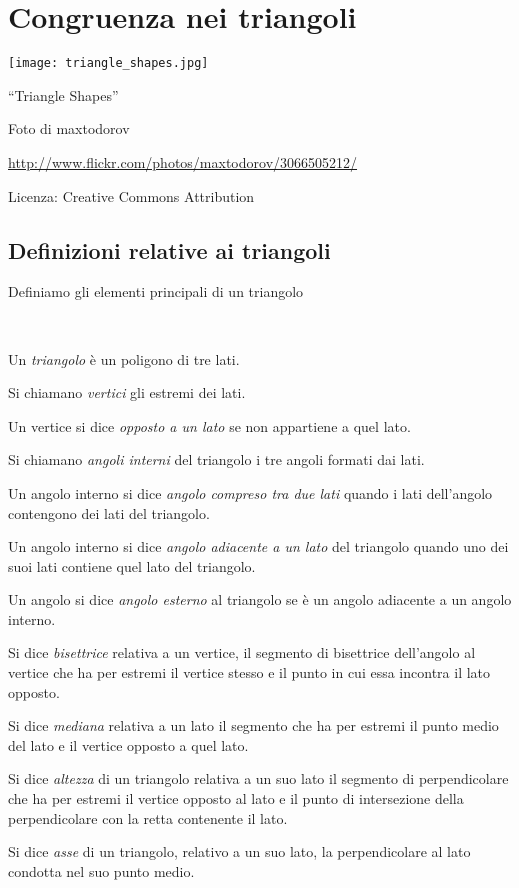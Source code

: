 
\chapter{Congruenza nei triangoli}\label{chap:congruenza_nei_triangoli}

\texttt{[image: triangle\_shapes.jpg]}
  \begin{center}
    {\large ``Triangle Shapes''}\par
    Foto di maxtodorov\par
    \url{http://www.flickr.com/photos/maxtodorov/3066505212/}\par
    Licenza: Creative Commons Attribution\par
  \end{center}
\newpage

\section{Definizioni relative ai triangoli}\label{sect:definizioni_triangoli}

Definiamo gli elementi principali di un triangolo
\begin{definizione}~
\begin{itemize*}
\item Un \emph{triangolo} è un poligono di tre lati.
\item Si chiamano \emph{vertici} gli estremi dei lati.
\item Un vertice si dice \emph{opposto a un lato} se non appartiene a quel lato.
\item Si chiamano \emph{angoli interni} del triangolo i tre angoli formati dai lati.
\item Un angolo interno si dice \emph{angolo compreso tra due lati} quando i lati dell'angolo contengono dei lati del triangolo.
\item Un angolo interno si dice \emph{angolo adiacente a un lato} del triangolo quando uno dei suoi lati contiene quel lato del triangolo.
\item Un angolo si dice \emph{angolo esterno} al triangolo se è un angolo adiacente a un angolo interno.
\item Si dice \emph{bisettrice} relativa a un vertice, il segmento di bisettrice dell'angolo al vertice che ha per estremi il vertice stesso e il punto in cui essa incontra il lato opposto.
\item Si dice \emph{mediana} relativa a un lato il segmento che ha per estremi il punto medio del lato e il vertice opposto a quel lato.
\item Si dice \emph{altezza} di un triangolo relativa a un suo lato il segmento di perpendicolare che ha per estremi il vertice opposto al lato e il punto di intersezione della perpendicolare con la retta contenente il lato. 
\item Si dice \emph{asse} di un triangolo, relativo a un suo lato, la perpendicolare al lato condotta nel suo punto medio.
\end{itemize*}
\end{definizione}

